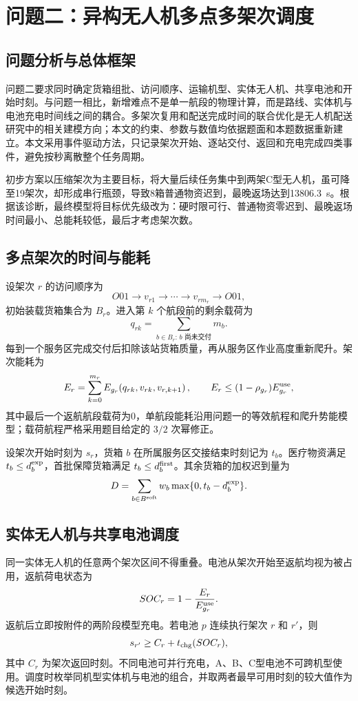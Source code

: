 \section{问题二：异构无人机多点多架次调度}

\subsection{问题分析与总体框架}

问题二要求同时确定货箱组批、访问顺序、运输机型、实体无人机、共享电池和开始时刻。与问题一相比，新增难点不是单一航段的物理计算，而是路线、实体机与电池充电时间线之间的耦合。多架次复用和配送完成时间的联合优化是无人机配送研究中的相关建模方向\cite{dorling2017}；本文的约束、参数与数值均依据题面和本题数据重新建立。本文采用事件驱动方法，只记录架次开始、逐站交付、返回和充电完成四类事件，避免按秒离散整个任务周期。

初步方案以压缩架次为主要目标，将大量后续任务集中到两架C型无人机，虽可降至19架次，却形成串行瓶颈，导致8箱普通物资迟到，最晚返场达到13806.3~s。根据该诊断，最终模型将目标优先级改为：硬时限可行、普通物资零迟到、最晚返场时间最小、总能耗较低，最后才考虑架次数。

\subsection{多点架次的时间与能耗}

设架次 $r$ 的访问顺序为
\[
O01\rightarrow v_{r1}\rightarrow \cdots\rightarrow v_{rm_r}\rightarrow O01,
\]
初始装载货箱集合为 $B_r$。进入第 $k$ 个航段前的剩余载荷为
\[
q_{rk}=\sum_{b\in B_r:\,b\text{ 尚未交付}}m_b.
\]
每到一个服务区完成交付后扣除该站货箱质量，再从服务区作业高度重新爬升。架次能耗为
\[
E_r=\sum_{k=0}^{m_r}E_{g_r}\!\left(q_{rk},v_{rk},v_{r,k+1}\right),
\qquad E_r\leq (1-\rho_{g_r})E^{\rm use}_{g_r},
\]
其中最后一个返航航段载荷为0，单航段能耗沿用问题一的等效航程和爬升势能模型；载荷航程严格采用题目给定的 $3/2$ 次幂修正。

设架次开始时刻为 $s_r$，货箱 $b$ 在所属服务区交接结束时刻记为 $t_b$。医疗物资满足 $t_b\leq d_b^{\rm exp}$，首批保障货箱满足 $t_b\leq d_b^{\rm first}$。其余货箱的加权迟到量为
\[
D=\sum_{b\in B^{\rm soft}}w_b\max\{0,t_b-d_b^{\rm exp}\}.
\]

\subsection{实体无人机与共享电池调度}

同一实体无人机的任意两个架次区间不得重叠。电池从架次开始至返航均视为被占用，返航荷电状态为
\[
SOC_r=1-\frac{E_r}{E_{g_r}^{\rm use}}.
\]
返航后立即按附件的两阶段模型充电。若电池 $p$ 连续执行架次 $r$ 和 $r'$，则
\[
s_{r'}\geq C_r+t_{\rm chg}(SOC_r),
\]
其中 $C_r$ 为架次返回时刻。不同电池可并行充电，A、B、C型电池不可跨机型使用。调度时枚举同机型实体机与电池的组合，并取两者最早可用时刻的较大值作为候选开始时刻。


